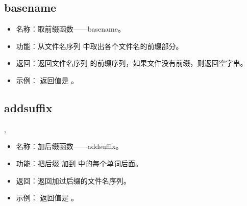 \documentclass[a4paper,10pt]{sphinxmanual}
\begin{document}
\subsection{basename}
\label{\detokenize{functions:basename}}
\begin{sphinxVerbatim}[commandchars=\\\{\}]
 \PYGZlt{}\PYGZgt{}
\end{sphinxVerbatim}
\begin{itemize}
\item {} 
名称：取前缀函数——basename。

\item {} 
功能：从文件名序列  中取出各个文件名的前缀部分。

\item {} 
返回：返回文件名序列  的前缀序列，如果文件没有前缀，则返回空字串。

\item {} 
示例：  返回值是
 。

\end{itemize}


\subsection{addsuffix}
\label{\detokenize{functions:addsuffix}}
\begin{sphinxVerbatim}[commandchars=\\\{\}]
 \PYGZlt{}\PYGZgt{},\PYGZlt{}\PYGZgt{}
\end{sphinxVerbatim}
\begin{itemize}
\item {} 
名称：加后缀函数——addsuffix。

\item {} 
功能：把后缀  加到  中的每个单词后面。

\item {} 
返回：返回加过后缀的文件名序列。

\item {} 
示例：  返回值是  。

\end{itemize}
\end{document}
